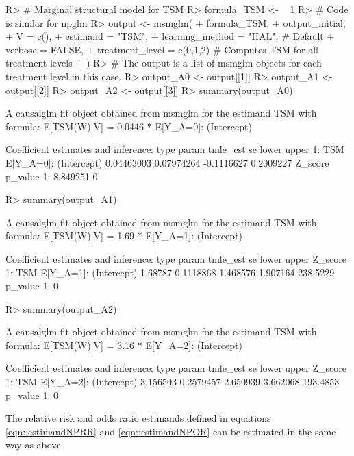 \documentclass[
]{jss}
\begin{document}
\begin{CodeChunk}
\begin{CodeInput}
R> # Marginal structural model for TSM
R> formula_TSM <- ~ 1  
R> # Code is similar for npglm
R> output <- msmglm( 
+       formula_TSM, 
+       output_initial,
+       V = c(),
+       estimand = "TSM", 
+       learning_method = "HAL", # Default
+       verbose = FALSE,
+       treatment_level = c(0,1,2) # Computes TSM for all treatment levels
+       )
R> # The output is a list of msmglm objects for each treatment level in this case.
R> output_A0 <- output[[1]]
R> output_A1 <- output[[2]]
R> output_A2 <- output[[3]]
R> summary(output_A0)
\end{CodeInput}
\begin{CodeOutput}
A causalglm fit object obtained from msmglm for the estimand TSM with formula: 
E[TSM(W)|V] = 0.0446 * E[Y_{A=0}]: (Intercept)

Coefficient estimates and inference:
   type                   param   tmle_est         se      lower     upper
1:  TSM E[Y_{A=0}]: (Intercept) 0.04463003 0.07974264 -0.1116627 0.2009227
    Z_score p_value
1: 8.849251       0
\end{CodeOutput}
\begin{CodeInput}
R> summary(output_A1)
\end{CodeInput}
\begin{CodeOutput}
A causalglm fit object obtained from msmglm for the estimand TSM with formula: 
E[TSM(W)|V] = 1.69 * E[Y_{A=1}]: (Intercept)

Coefficient estimates and inference:
   type                   param tmle_est        se    lower    upper  Z_score
1:  TSM E[Y_{A=1}]: (Intercept)  1.68787 0.1118868 1.468576 1.907164 238.5229
   p_value
1:       0
\end{CodeOutput}
\begin{CodeInput}
R> summary(output_A2)
\end{CodeInput}
\begin{CodeOutput}
A causalglm fit object obtained from msmglm for the estimand TSM with formula: 
E[TSM(W)|V] = 3.16 * E[Y_{A=2}]: (Intercept)

Coefficient estimates and inference:
   type                   param tmle_est        se    lower    upper  Z_score
1:  TSM E[Y_{A=2}]: (Intercept) 3.156503 0.2579457 2.650939 3.662068 193.4853
   p_value
1:       0
\end{CodeOutput}
\end{CodeChunk}

The relative risk and odds ratio estimands defined in equations
\ref{eqn::estimandNPRR} and \ref{eqn::estimandNPOR} can be estimated in
the same way as above.
\end{document}
